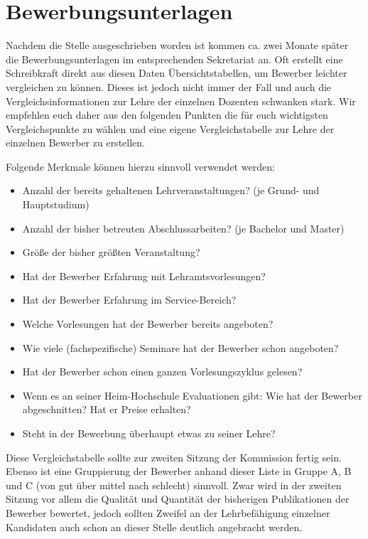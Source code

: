 \documentclass[10pt,twoside,a5paper,openright]{book}
\begin{document}
\section{Bewerbungsunterlagen}\thispagestyle{fancy}
Nachdem die Stelle ausgeschrieben worden ist kommen ca. zwei Monate später die Bewerbungsunterlagen im entsprechenden Sekretariat an. Oft erstellt eine Schreibkraft direkt aus diesen Daten Übersichtstabellen, um Bewerber leichter vergleichen zu können. Dieses ist jedoch nicht immer der Fall und auch die Vergleichsinformationen zur Lehre der einzelnen Dozenten schwanken stark. Wir empfehlen euch daher aus den folgenden Punkten die für euch wichtigsten Vergleichspunkte zu wählen und eine eigene Vergleichstabelle zur Lehre der einzelnen Bewerber zu erstellen.

Folgende Merkmale können hierzu sinnvoll verwendet werden:
\begin{itemize}
	\item Anzahl der bereits gehaltenen Lehrveranstaltungen? (je Grund- und Hauptstudium)
	\item Anzahl der bisher betreuten Abschlussarbeiten? (je Bachelor und Master)
	\item Größe der bisher größten Veranstaltung?
	\item Hat der Bewerber Erfahrung mit Lehramtsvorlesungen?
	\item Hat der Bewerber Erfahrung im Service-Bereich?
	\item Welche Vorlesungen hat der Bewerber bereits angeboten?
	\item Wie viele (fachspezifische) Seminare hat der Bewerber schon angeboten?
	\item Hat der Bewerber schon einen ganzen Vorlesungszyklus gelesen?
	\item Wenn es an seiner Heim-Hochschule Evaluationen gibt: Wie hat der Bewerber abgeschnitten? Hat er Preise erhalten?
	\item Steht in der Bewerbung überhaupt etwas zu seiner Lehre?
\end{itemize}

Diese Vergleichstabelle sollte zur zweiten Sitzung der Kommission fertig sein. Ebenso ist eine Gruppierung der Bewerber anhand dieser Liste in Gruppe A, B und C (von gut über mittel nach schlecht) sinnvoll. Zwar wird in der zweiten Sitzung vor allem die Qualität und Quantität der bisherigen Publikationen der Bewerber bewertet, jedoch sollten Zweifel an der Lehrbefähigung einzelner Kandidaten auch schon an dieser Stelle deutlich angebracht werden.
\end{document}
